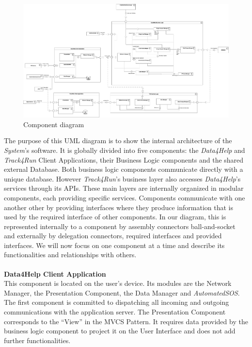\documentclass[titlepage]{article}
\begin{document}
\begin{figure}[H]
	\flushleft
  	\includegraphics[width=15cm]{ComponentDiagram.png}
  	\caption{Component diagram}
 	\label{fig:COMPDIA}
\end{figure}
\noindent
The purpose of this UML diagram is to show the internal architecture of the {\it System}’s software. It is globally divided into five components: the {\it Data4Help} and {\it Track4Run} Client Applications, their Business Logic components and the shared external Database. Both business logic components communicate directly with a unique database. However {\it Track4Run}’s business layer also accesses {\it Data4Help}’s services through its APIs. These main layers are internally organized in modular components, each providing specific services. 
Components communicate with one another other by providing interfaces where they produce information that is used by the required interface of other components. In our diagram, this is represented internally to a component by assembly connectors ball-and-socket and externally by delegation connectors, required interfaces and provided interfaces.
We will now focus on one component at a time and describe its functionalities and relationships with others. \\ \\
{\bf Data4Help Client Application }\\
This component is located on the user’s device. Its modules are the Network Manager, the Presentation Component, the Data Manager and {\it AutomatedSOS}. 
The first component is committed to dispatching all incoming and outgoing communications with the application server. 
The Presentation Component corresponds to the “View” in the MVCS Pattern. It requires data provided by the business logic component to project it on the User Interface and does not add further functionalities. 
\end{document}
